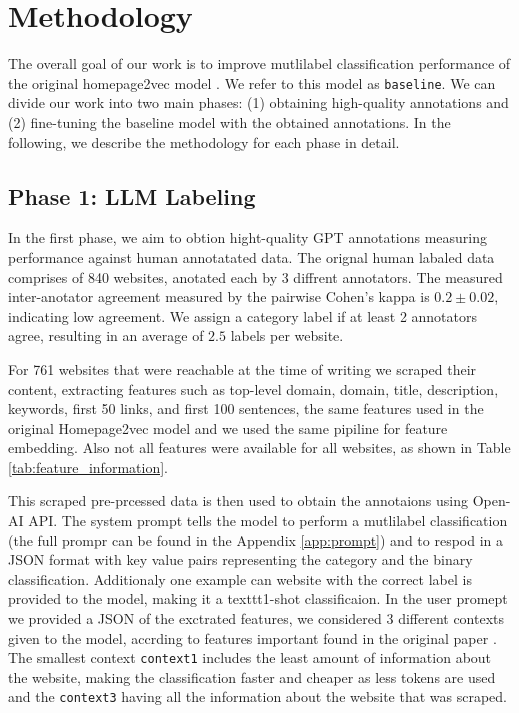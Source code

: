 \section{Methodology}\label{sec:methods}

The overall goal of our work is to improve mutlilabel classification performance of the original homepage2vec model \cite{homepage2vec}. 
We refer to this model as \texttt{baseline}. 
We can divide our work into two main phases: (1) obtaining high-quality annotations and (2) fine-tuning the baseline model with the obtained annotations. 
In the following, we describe the methodology for each phase in detail.

\subsection* {Phase 1: LLM Labeling}
In the first phase, we aim to obtion hight-quality GPT annotations measuring performance against human annotatated data.
The orignal human labaled data comprises of 840 websites, anotated each by 3 diffrent annotators. 
The measured inter-anotator agreement measured by the pairwise Cohen's kappa \cite{cohen-coef} is $0.2 \pm 0.02$, indicating low agreement. 
We assign a category label if at least 2 annotators agree, resulting in an average of $2.5$ labels per website.

For 761 websites that were reachable at the time of writing we scraped their content, extracting features such as top-level domain, domain, title, description, keywords, first 50 links, and first 100 sentences, the same features used in the original Homepage2vec model \cite{homepage2vec} and we used the same pipiline for feature embedding.
Also not all features were available for all websites, as shown in Table \ref{tab:feature_information}.


This scraped pre-prcessed data is then used to obtain the annotaions using Open-AI API.
The system prompt tells the model to perform a mutlilabel classification (the full prompr can be found in the Appendix \ref{app:prompt}) and to respod in a JSON format with key value pairs representing the category and the binary classification. Additionaly one example can website with the correct label is provided to the model, making it a texttt{1-shot} classificaion.
In the user promept we provided a JSON of the exctrated features, we considered 3 different contexts given to the model, accrding to features important found in the original paper \cite{homepage2vec}. 
The smallest context \texttt{context1} includes the least amount of information about the website, making the classification faster and cheaper as less tokens are used and the \texttt{context3} having all the information about the website that was scraped.

